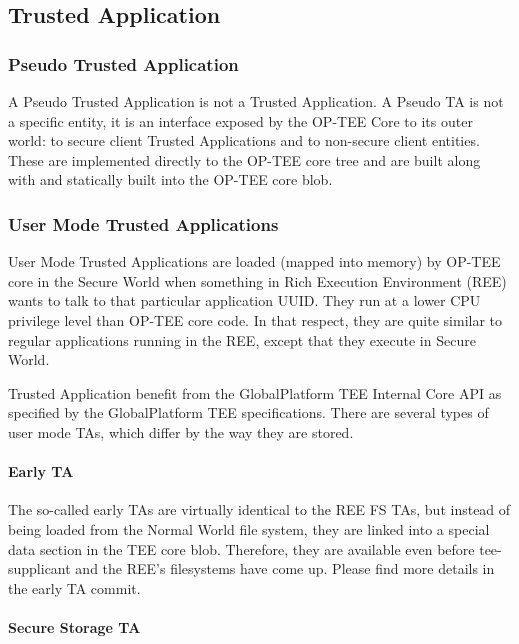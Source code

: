 \documentclass{article}
\begin{document}
\subsection{Trusted Application}

\subsubsection{Pseudo Trusted Application}

A Pseudo Trusted Application is not a Trusted Application. A Pseudo TA is not a specific entity, it is an interface exposed by the OP-TEE Core to its outer world: to secure client Trusted Applications and to non-secure client entities. These are implemented directly to the OP-TEE core tree and are built along with and statically built into the OP-TEE core blob.

\subsubsection{User Mode Trusted Applications}

User Mode Trusted Applications are loaded (mapped into memory) by OP-TEE core in the Secure World when something in Rich Execution Environment (REE) wants to talk to that particular application UUID. They run at a lower CPU privilege level than OP-TEE core code. In that respect, they are quite similar to regular applications running in the REE, except that they execute in Secure World.

Trusted Application benefit from the GlobalPlatform TEE Internal Core API as specified by the GlobalPlatform TEE specifications. There are several types of user mode TAs, which differ by the way they are stored.

\paragraph{Early TA}

The so-called early TAs are virtually identical to the REE FS TAs, but instead of being loaded from the Normal World file system, they are linked into a special data section in the TEE core blob. Therefore, they are available even before tee-supplicant and the REE’s filesystems have come up. Please find more details in the early TA commit.

\paragraph{Secure Storage TA}
\end{document}
